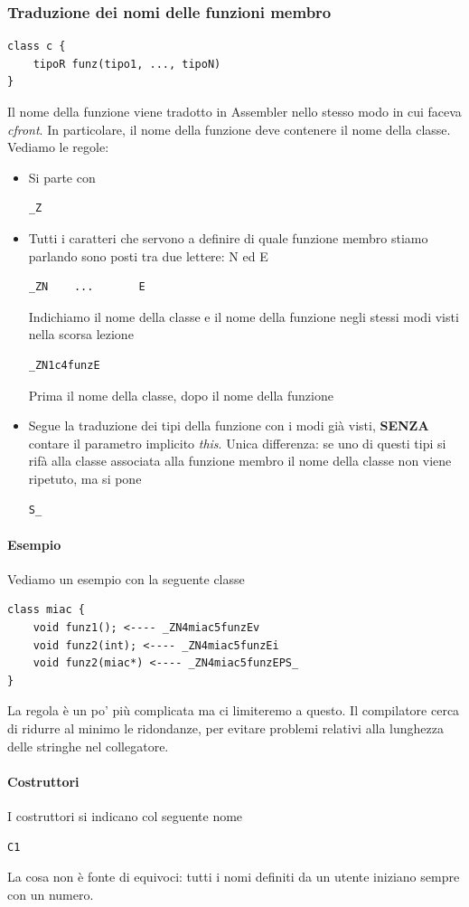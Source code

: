 \documentclass[11pt]{report}
\theoremstyle{definition}
\begin{document}
\subsubsection{Traduzione dei nomi delle funzioni membro}
\begin{verbatim}
class c {
    tipoR funz(tipo1, ..., tipoN)
}
\end{verbatim}
Il nome della funzione viene tradotto in Assembler nello stesso modo in cui faceva \emph{cfront}. In particolare, il nome della funzione deve contenere il nome della classe. Vediamo le regole:
\begin{itemize}
\item Si parte con
\begin{verbatim}
_Z
\end{verbatim}
\item Tutti i caratteri che servono a definire di quale funzione membro stiamo parlando sono posti tra due lettere: N ed E
\begin{verbatim}
_ZN    ...       E
\end{verbatim}
Indichiamo il nome della classe e il nome della funzione negli stessi modi visti nella scorsa lezione
\begin{verbatim}
_ZN1c4funzE
\end{verbatim}
Prima il nome della classe, dopo il nome della funzione
\item Segue la traduzione dei tipi della funzione con i modi già visti, \textbf{SENZA} contare il parametro implicito \emph{this}. Unica differenza: se uno di questi tipi si rifà alla classe associata alla funzione membro il nome della classe non viene ripetuto, ma si pone
\begin{verbatim}
S_
\end{verbatim}
\end{itemize}
\paragraph{Esempio} Vediamo un esempio con la seguente classe
\begin{verbatim}
class miac {
    void funz1(); <---- _ZN4miac5funzEv
    void funz2(int); <---- _ZN4miac5funzEi
    void funz2(miac*) <---- _ZN4miac5funzEPS_
}
\end{verbatim}
La regola è un po' più complicata ma ci limiteremo a questo. Il compilatore cerca di ridurre al minimo le ridondanze, per evitare problemi relativi alla lunghezza delle stringhe nel collegatore.
\paragraph{Costruttori} I costruttori si indicano col seguente nome
\begin{verbatim}
C1
\end{verbatim}
La cosa non è fonte di equivoci: tutti i nomi definiti da un utente iniziano sempre con un numero.
\end{document}
